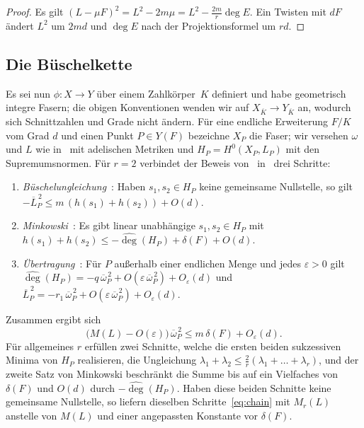 \documentclass[11pt]{article}
\theoremstyle{definition}
\theoremstyle{remark}
\newcommand{\ob}{\overline{\omega}}
\newcommand{\Lb}{\overline{L}}
\newcommand{\degh}{\widehat{\deg}}
\begin{document}
\begin{proof}
Es gilt $(L-\mu F)^2=L^2-2m\mu=L^2-\frac{2m}{r}\deg E$. Ein Twisten mit $dF$
ändert $L^2$ um $2md$ und $\deg E$ nach der Projektionsformel um $rd$.
\end{proof}

\subsection{Die Büschelkette}\label{subsec:chain}
Es sei nun $\phi\colon X\to Y$ über einem Zahlkörper~$K$ definiert und habe
geometrisch integre Fasern; die obigen Konventionen wenden wir auf
$X_{\overline K}\to Y_{\overline K}$ an, wodurch sich Schnittzahlen und Grade
nicht ändern. Für eine endliche Erweiterung $F/K$ vom Grad $d$ und einen Punkt
$P\in Y(F)$ bezeichne $X_P$ die Faser; wir versehen $\omega$ und $L$ wie
in~\cite[\S1.3]{So26} mit adelischen Metriken und $H_P=H^0(X_P,L_P)$ mit den
Supremumsnormen. Für $r=2$ verbindet der Beweis von~\cite[Theorem~1]{So26}
in~\cite[\S6.3]{So26} drei Schritte:
\begin{enumerate}[label=(\roman*)]
\item \emph{Büschelungleichung}~\cite[Prop.~3, (28), (29)]{So26}: Haben
$s_1,s_2\in H_P$ keine gemeinsame Nullstelle, so gilt
$-\Lb_P^{\,2}\le m\,(h(s_1)+h(s_2))+O(d)$.
\item \emph{Minkowski}~\cite[(2), (30)]{So26}: Es gibt linear unabhängige
$s_1,s_2\in H_P$ mit $h(s_1)+h(s_2)\le-\degh(H_P)+\delta(F)+O(d)$.
\item \emph{Übertragung}~\cite[(32), Cor.~1, (33), (35)]{So26}: Für $P$
außerhalb einer endlichen Menge und jedes $\varepsilon>0$ gilt
$\degh(H_P)=-q\,\ob_P^{\,2}+O(\varepsilon\,\ob_P^{\,2})+O_\varepsilon(d)$ und
$\Lb_P^{\,2}=-r_1\,\ob_P^{\,2}+O(\varepsilon\,\ob_P^{\,2})+O_\varepsilon(d)$.
\end{enumerate}
Zusammen ergibt sich
\begin{equation}\label{eq:chain}
\bigl(M(L)-O(\varepsilon)\bigr)\,\ob_P^{\,2}\le m\,\delta(F)+O_\varepsilon(d).
\end{equation}
Für allgemeines $r$ erfüllen zwei Schnitte, welche die ersten beiden sukzessiven
Minima von $H_P$ realisieren, die Ungleichung
$\lambda_1+\lambda_2\le\frac{2}{r}(\lambda_1+\dots+\lambda_r)$, und der zweite
Satz von Minkowski beschränkt die Summe bis auf ein Vielfaches von $\delta(F)$
und $O(d)$ durch $-\degh(H_P)$. Haben diese beiden Schnitte keine gemeinsame
Nullstelle, so liefern dieselben Schritte~\eqref{eq:chain} mit $M_r(L)$ anstelle
von $M(L)$ und einer angepassten Konstante vor $\delta(F)$.
\end{document}
